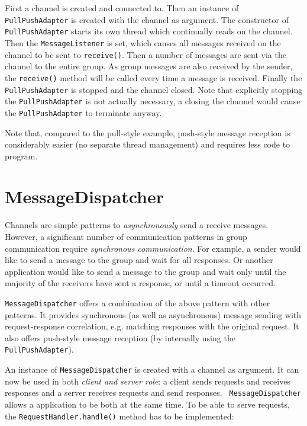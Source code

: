     First a channel is created and connected to. Then an instance of {\tt
    PullPushAdapter} is created with the channel as argument. The constructor of {\tt
    PullPushAdapter} starts its own thread which continually reads on the
    channel. Then the {\tt MessageListener} is set, which causes all messages received
    on the channel to be sent to {\tt receive()}. Then a number of messages are sent
    via the channel to the entire group. As group messages are also received by the
    sender, the {\tt receive()} method will be called every time a message is
    received. Finally the {\tt PullPushAdapter} is stopped and the channel
    closed. Note that explicitly stopping the {\tt PullPushAdapter} is not actually
    necessary, a closing the channel would cause the {\tt PullPushAdapter} to
    terminate anyway.

    Note that, compared to the pull-style example, push-style message reception is
    considerably easier (no separate thread management) and requires less code to
    program.




  \section{MessageDispatcher} \label{MessageDispatcher}
	
  Channels are simple patterns to {\em asynchronously} send a receive
  messages. However, a significant number of communication patterns in group
  communication require {\em synchronous communication}. For example, a sender would
  like to send a message to the group and wait for all responses. Or another
  application would like to send a message to the group and wait only until the
  majority of the receivers have sent a response, or until a timeout occurred.

  {\tt MessageDispatcher} offers a combination of the above pattern with other
  patterns. It provides synchronous (as well as asynchronous) message sending with
  request-response correlation, e.g. matching responses with the original request. It
  also offers push-style message reception (by internally using the {\tt
  PullPushAdapter}).

  An instance of {\tt MessageDispatcher} is created with a channel as argument. It
  can now be used in both {\em client and server role}: a client sends requests and
  receives responses and a server receives requests and send responses. {\tt
  MessageDispatcher} allows a application to be both at the same time. To be able to
  serve requests, the {\tt RequestHandler.handle()} method has to be implemented:

